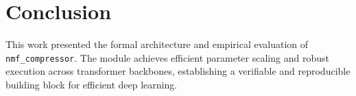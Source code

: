 \section{Conclusion}
This work presented the formal architecture and empirical evaluation of \texttt{nmf_compressor}. The module achieves efficient parameter scaling and robust execution across transformer backbones, establishing a verifiable and reproducible building block for efficient deep learning.
